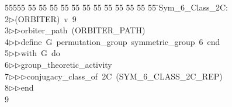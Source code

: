 %
%
\begin{tabbing}
55555 \= 55 \= 55 \= 55 \= 55 \= 55 \= 55 \= 55 \= 55 \= 55 \= 55 \= 55 \= 55 \= \>Sym\_6\_Class\_2C:\\[0pt]
2\>$\triangleright$\>(ORBITER)\ v\ 9\ \\[0pt]
3\>$\triangleright$\>$\triangleright$\>orbiter\_path\ (ORBITER\_PATH)\ \\[0pt]
4\>$\triangleright$\>$\triangleright$\>define\ G\ permutation\_group\ symmetric\_group\ 6\ end\ \\[0pt]
5\>$\triangleright$\>$\triangleright$\>with\ G\ do\ \\[0pt]
6\>$\triangleright$\>$\triangleright$\>group\_theoretic\_activity\ \\[0pt]
7\>$\triangleright$\>$\triangleright$\>$\triangleright$\>conjugacy\_class\_of\ 2C\ (SYM\_6\_CLASS\_2C\_REP)\ \\[0pt]
8\>$\triangleright$\>$\triangleright$\>end\\[0pt]
9\>\end{tabbing}
